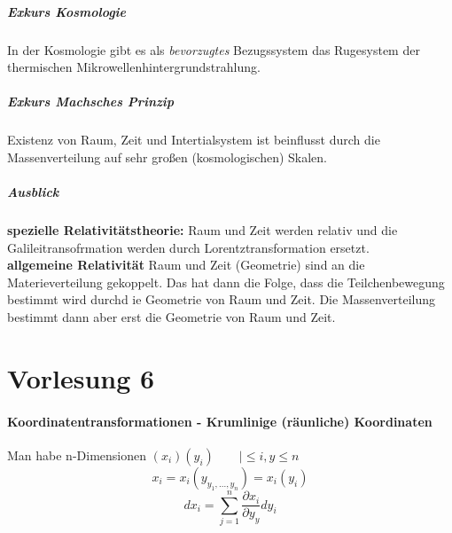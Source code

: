 \documentclass[11pt]{article}
\begin{document}
								\subsubsection{Exkurs Kosmologie}
									In der Kosmologie gibt es als \textit{bevorzugtes} Bezugssystem das Rugesystem der thermischen Mikrowellenhintergrundstrahlung.
									\subsubsection{Exkurs Machsches Prinzip}
										Existenz von Raum, Zeit und Intertialsystem ist beinflusst durch die Massenverteilung auf sehr großen (kosmologischen) Skalen.
									\subsubsection{Ausblick}
										\textbf{spezielle Relativitätstheorie:} Raum und Zeit werden relativ und die Galileitransofrmation werden durch Lorentztransformation ersetzt.\\
										\textbf{allgemeine Relativität}  Raum und Zeit (Geometrie) sind an die Materieverteilung gekoppelt. Das hat dann die Folge, dass die Teilchenbewegung bestimmt wird durchd ie Geometrie von Raum und Zeit. Die Massenverteilung bestimmt dann aber erst die Geometrie von Raum und Zeit.
						\part{Vorlesung 6}
							\subsection{Koordinatentransformationen - Krumlinige (räunliche) Koordinaten}
								Man habe n-Dimensionen $ (x_i) (y_i) \qquad |\leq i,y \leq n  $	
								\[ x_i = x_i(y_{y_1, ..., y_n}) = x_i(y_i) \]
								\[ dx_i = \sum_{j = 1}^{n} \frac{\partial x_i}{\partial y_y} dy_i \]
\end{document}
